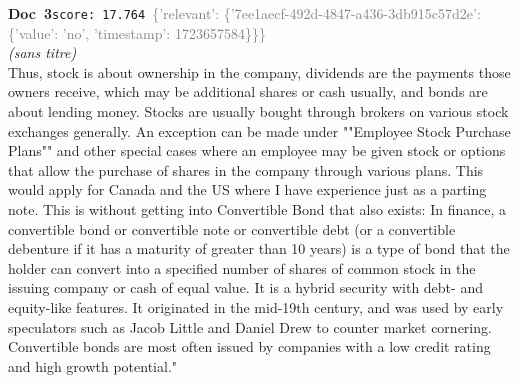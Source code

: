 \documentclass[a4paper,11pt]{article}
\begin{document}
\begin{docenv}
{\footnotesize\textcolor{doccolor}{\textbf{Doc~3}}}\hfill{\tiny\texttt{score:~17.764}}\ {\tiny\textcolor{gray}{\{'relevant': \{'7ee1aecf-492d-4847-a436-3db915c57d2e': \{'value': 'no', 'timestamp': 1723657584\}\}\}}}\\[3pt]
{\small\textit{(sans titre)}}\\[2pt]
\vspace{2pt}
{\footnotesize 
Thus, stock is about ownership in the company, dividends are the payments those owners receive, which may be additional shares or cash usually, and bonds are about lending money. Stocks are usually bought through brokers on various stock exchanges generally. An exception can be made under ""Employee Stock Purchase Plans"" and other special cases where an employee may be given stock or options that allow the purchase of shares in the company through various plans. This would apply for Canada and the US where I have experience just as a parting note. This is without getting into Convertible Bond that also exists: In finance, a convertible bond or convertible note or convertible debt (or a convertible debenture if it has a maturity of greater than 10 years) is a type of bond that the holder can convert into a specified number of shares of common stock in the issuing company or cash of equal value. It is a hybrid security with debt- and equity-like features. It originated in the mid-19th century, and was used by early speculators such as Jacob Little and Daniel Drew to counter market cornering. Convertible bonds are most often issued by companies with a low credit rating and high growth potential."}
\end{docenv}
\end{document}
